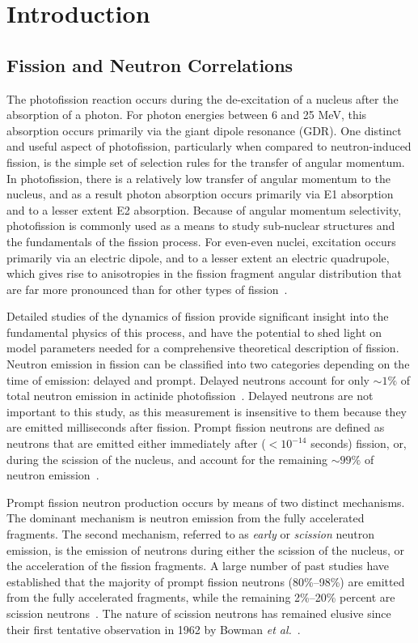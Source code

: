 \chapter{Introduction}
\thispagestyle{empty}

\label{sec:level1}

\section{Fission and Neutron Correlations}
The photofission reaction occurs during the de-excitation of a nucleus after the absorption of a photon.
For photon energies between 6 and 25 MeV, this absorption occurs primarily via the giant dipole resonance (GDR).
One distinct and useful aspect of photofission, particularly when compared to neutron-induced fission, is the simple set of selection rules for the transfer of angular momentum.
In photofission, there is a relatively low transfer of angular momentum to the nucleus, and as a result photon absorption occurs primarily via E1 absorption and to a lesser extent E2 absorption.
Because of angular momentum selectivity, photofission is commonly used as a means to study sub-nuclear structures and the fundamentals of the fission process.
For even-even nuclei, excitation occurs primarily via an electric dipole, and to a lesser extent an electric quadrupole, which gives rise to anisotropies in the fission fragment angular distribution that are far more pronounced than for other types of fission~\cite{1977FragAss}.

Detailed studies of the dynamics of fission provide significant insight into the fundamental physics of this process, and have the potential to shed light on model parameters needed for a comprehensive theoretical description of fission.
Neutron emission in fission can be classified into two categories depending on the time of emission: delayed and prompt.
Delayed neutrons account for only $\sim1\%$ of total neutron emission in actinide photofission~\cite{Caldwell2017DelayedNs}.
Delayed neutrons are not important to this study, as this measurement is insensitive to them because they are emitted milliseconds after fission.
Prompt fission neutrons are defined as neutrons that are emitted either immediately after ($<10^{-14}$ seconds) fission, or, during the scission of the nucleus, and account for the remaining $\sim99\%$ of neutron emission~\cite{Caldwell2017DelayedNs}.

Prompt fission neutron production occurs by means of two distinct mechanisms.
The dominant mechanism is neutron emission from the fully accelerated fragments.
The second mechanism, referred to as \textit{early} or \textit{scission} neutron emission, is the emission of neutrons during either the scission of the nucleus, or the acceleration of the fission fragments.
A large number of past studies have established that the majority of prompt fission neutrons (80\%--98\%) are emitted from the fully accelerated fragments, while the remaining 2\%--20\% percent are scission neutrons~\cite{Scission2005}.
The nature of scission neutrons has remained elusive since their first tentative observation in 1962 by Bowman \emph{et al.}~\cite{Bowman}.


